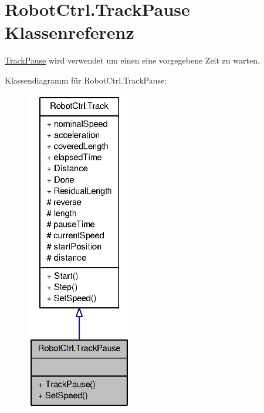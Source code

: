 \hypertarget{class_robot_ctrl_1_1_track_pause}{
\section{RobotCtrl.TrackPause Klassenreferenz}
\label{class_robot_ctrl_1_1_track_pause}
}


\hyperlink{class_robot_ctrl_1_1_track_pause}{TrackPause} wird verwendet um einen eine vorgegebene Zeit zu warten.  




Klassendiagramm für RobotCtrl.TrackPause:\nopagebreak
\begin{figure}[H]
\begin{center}
\leavevmode
\includegraphics[height=400pt]{class_robot_ctrl_1_1_track_pause__inherit__graph}
\end{center}
\end{figure}


